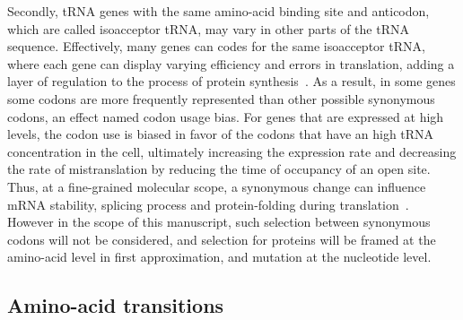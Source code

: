 Secondly, \acrshort{tRNA} genes with the same amino-acid binding site and anticodon, which are called isoacceptor \acrshort{tRNA}, may vary in other parts of the \acrshort{tRNA} sequence.
Effectively, many genes can codes for the same isoacceptor \acrshort{tRNA}, where each gene can display varying efficiency and errors in translation, adding a layer of regulation to the process of protein synthesis~\citep{Lowe1997,Chan2008,Juhling2008,Lin2019}.
As a result, in some genes some \glspl{codon} are more frequently represented than other possible synonymous \glspl{codon}, an effect named \gls{codon} usage bias.
For genes that are expressed at high levels, the \gls{codon} use is biased in favor of the \glspl{codon} that have an high \acrshort{tRNA} concentration in the cell, ultimately increasing the expression rate and decreasing the rate of mistranslation by reducing the time of occupancy of an open site.
Thus, at a fine-grained molecular scope, a synonymous change can influence mRNA stability, splicing process and protein-folding during translation~\citep{Plotkin2011, Rak2018}.
However in the scope of this manuscript, such selection between synonymous \glspl{codon} will not be considered, and selection for proteins will be framed at the amino-acid level in first approximation, and mutation at the nucleotide level.

\subsection{Amino-acid transitions}

